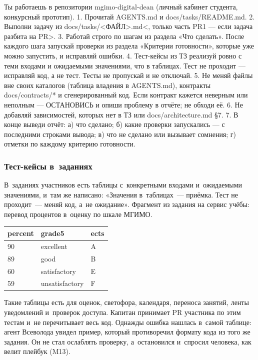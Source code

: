\documentclass[a4paper,10pt]{article}
\let\oldsubsubsection\subsubsection
\renewcommand{\subsubsection}{\Needspace{8\baselineskip}\oldsubsubsection}
\newcommand{\hd}[1]{\textbf{#1}}
\newcommand{\rowsep}{\arrayrulecolor{line}\specialrule{0.4pt}{2pt}{2pt}\arrayrulecolor{ink}}
\begin{document}
\begin{listing}
Ты работаешь в репозитории mgimo-digital-dean (личный кабинет студента, конкурсный прототип).
1. Прочитай AGENTS.md и docs/tasks/README.md.
2. Выполни задачу из docs/tasks/<ФАЙЛ>.md<, только часть PR1 — если задача разбита на PR>.
3. Работай строго по шагам из раздела «Что сделать». После каждого шага запускай проверки
   из раздела «Критерии готовности», которые уже можно запустить, и исправляй ошибки.
4. Тест-кейсы из ТЗ реализуй ровно с теми входами и ожидаемыми значениями, что в таблицах.
   Тест не проходит — исправляй код, а не тест. Тесты не пропускай и не отключай.
5. Не меняй файлы вне своих каталогов (таблица владения в AGENTS.md), контракты docs/contracts/*
   и сгенерированный код. Если контракт кажется неверным или неполным — ОСТАНОВИСЬ
   и опиши проблему в отчёте; не обходи её.
6. Не добавляй зависимостей, которых нет в ТЗ или docs/architecture.md §7.
7. В конце выведи отчёт: а) что сделано; б) какие проверки запускались — с последними строками
   вывода; в) что не сделано или вызывает сомнения; г) отметки по каждому критерию готовности.
\end{listing}

\subsubsection*{Тест-кейсы в~заданиях}

В~заданиях участников есть таблицы с~конкретными входами и~ожидаемыми значениями, и~там же написано: «Значения в~таблицах~— приёмка. Тест не проходит~— меняй код, а~не ожидание». Фрагмент из задания на сервис учёбы: перевод процентов в~оценку по шкале МГИМО.

\noindent
\begin{tabular}{@{}lll@{}}
\toprule
\hd{percent} & \hd{grade5} & \hd{ects} \\
\midrule
90 & excellent & A \\ \rowsep
89 & good & B \\ \rowsep
60 & satisfactory & E \\ \rowsep
59 & unsatisfactory & F \\
\bottomrule
\end{tabular}

Такие таблицы есть для оценок, светофора, календаря, переноса занятий, ленты уведомлений и~проверок доступа. Капитан принимает PR участника по этим тестам и~не перечитывает весь код. Однажды ошибка нашлась в~самой таблице: агент Всеволода увидел пример, который противоречил формату кода из того же задания. Он не стал ослаблять проверку, а~остановился и~спросил человека, как велит плейбук (M13).
\end{document}
